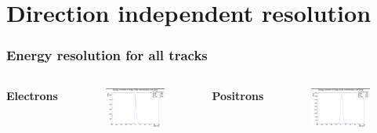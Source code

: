 \documentclass{beamer}
\begin{document}
	\section{Direction independent resolution}
	
		\begin{frame}
			\frametitle{Energy resolution for all tracks}
			\begin{columns}
				\centering
				\Large \textbf{Electrons}
				\begin{figure}
					\centering
					\includegraphics[width = 0.95 \linewidth]{../images/c_e_delta_energy.png}
				\end{figure}
				\centering
				\Large \textbf{Positrons}
				\begin{figure}
					\centering
					\includegraphics[width = 0.95 \linewidth]{../images/c_p_delta_energy.png}
				\end{figure}
			\end{columns}
		\end{frame}
\end{document}
